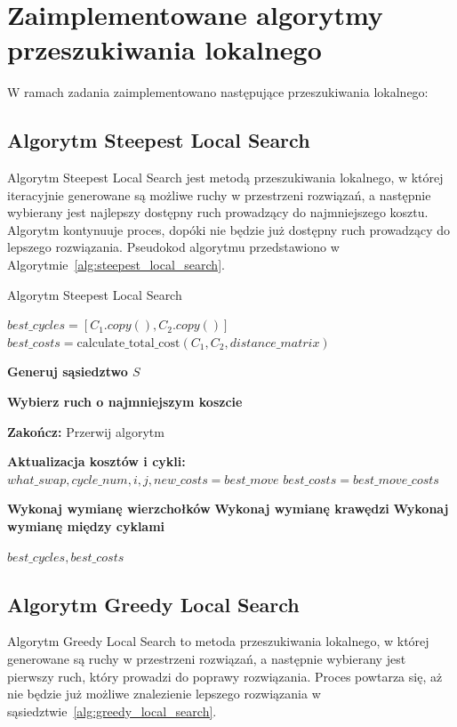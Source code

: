 \documentclass[12pt,a4paper]{article}
\begin{document}
\newpage

\section{Zaimplementowane algorytmy przeszukiwania lokalnego}
W ramach zadania zaimplementowano następujące przeszukiwania lokalnego:

\subsection{Algorytm Steepest Local Search}
Algorytm Steepest Local Search jest metodą przeszukiwania lokalnego, w której iteracyjnie generowane są możliwe ruchy w przestrzeni rozwiązań, a następnie wybierany jest najlepszy dostępny ruch prowadzący do najmniejszego kosztu. Algorytm kontynuuje proces, dopóki nie będzie już dostępny ruch prowadzący do lepszego rozwiązania. Pseudokod algorytmu przedstawiono w Algorytmie~\ref{alg:steepest_local_search}.

\begin{algorithm}[H]
\caption{Algorytm Steepest Local Search}
\label{alg:steepest_local_search}
\begin{algorithmic}[1]

\State $best\_cycles = [C_1.copy(), C_2.copy()]$
\State $best\_costs = \text{calculate\_total\_cost}(C_1, C_2, distance\_matrix)$

    \State \textbf{Generuj sąsiedztwo $S$}

    \State \textbf{Wybierz ruch o najmniejszym koszcie}

        \State \textbf{Zakończ:} Przerwij algorytm
    \EndIf

    \State \textbf{Aktualizacja kosztów i cykli:}
    \State $what\_swap, cycle\_num, i, j, new\_costs = best\_move$
    \State $best\_costs = best\_move\_costs$

        \State \textbf{Wykonaj wymianę wierzchołków}
        \State \textbf{Wykonaj wymianę krawędzi}
    \Else
        \State \textbf{Wykonaj wymianę między cyklami}
    \EndIf
\EndWhile

\State \Return $best\_cycles, best\_costs$
\end{algorithmic}
\end{algorithm}

\newpage
\subsection{Algorytm Greedy Local Search}
Algorytm Greedy Local Search to metoda przeszukiwania lokalnego, w której  generowane są ruchy w przestrzeni rozwiązań, a następnie wybierany jest pierwszy ruch, który prowadzi do poprawy rozwiązania. Proces powtarza się, aż nie będzie już możliwe znalezienie lepszego rozwiązania w sąsiedztwie~\ref{alg:greedy_local_search}.
\end{document}
